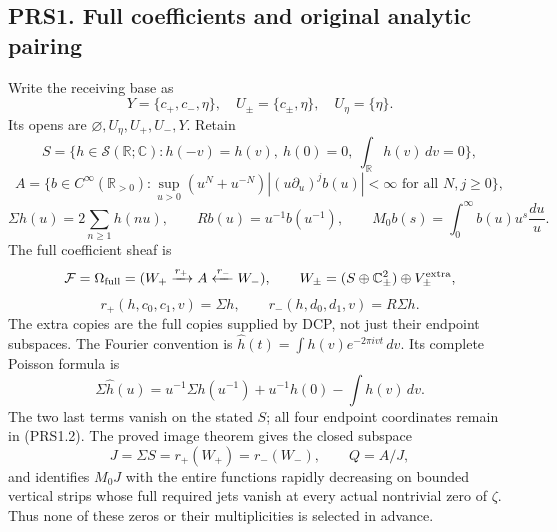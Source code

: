 \subsection{PRS1. Full coefficients and original analytic
pairing}\label{prs1.-full-coefficients-and-original-analytic-pairing}

Write the receiving base as \[
Y=\{c_+,c_-,\eta\},\quad U_\pm=\{c_\pm,\eta\},\quad U_\eta=\{\eta\}.
\] Its opens are \(\varnothing,U_\eta,U_+,U_-,Y\). Retain \[
S=\{h\in\mathcal S(\mathbb R;\mathbb C):h(-v)=h(v),\ h(0)=0,\ \int_{\mathbb R}h(v)\,dv=0\},
\] \[
A=\{b\in C^\infty(\mathbb R_{>0}):\sup_{u>0}(u^N+u^{-N})|(u\partial_u)^jb(u)|<\infty\text{ for all }N,j\geq0\},
\] \[
\Sigma h(u)=2\sum_{n\geq1}h(nu),\qquad Rb(u)=u^{-1}b(u^{-1}),\qquad
M_0b(s)=\int_0^\infty b(u)u^s\frac{du}{u}.
\tag{PRS1.1}
\] The full coefficient sheaf is \[
\mathcal F=\Omega_{\rm full}=(W_+\xrightarrow{r_+}A\xleftarrow{r_-}W_-),\qquad
W_\pm=(S\oplus\mathbb C^2_\pm)\oplus V_\pm^{\rm extra},
\] \[
r_+(h,c_0,c_1,v)=\Sigma h,\qquad r_-(h,d_0,d_1,v)=R\Sigma h.
\tag{PRS1.2}
\] The extra copies are the full copies supplied by DCP, not just their
endpoint subspaces. The Fourier convention is
\(\widehat h(t)=\int h(v)e^{-2\pi ivt}\,dv\). Its complete Poisson
formula is \[
\Sigma\widehat h(u)=u^{-1}\Sigma h(u^{-1})+u^{-1}h(0)-\int h(v)\,dv.
\tag{PRS1.3}
\] The two last terms vanish on the stated \(S\); all four endpoint
coordinates remain in (PRS1.2). The proved image theorem gives the
closed subspace \[
J=\Sigma S=r_+(W_+)=r_-(W_-),\qquad Q=A/J,
\] and identifies \(M_0J\) with the entire functions rapidly decreasing
on bounded vertical strips whose full required jets vanish at every
actual nontrivial zero of \(\zeta\). Thus none of these zeros or their
multiplicities is selected in advance.

